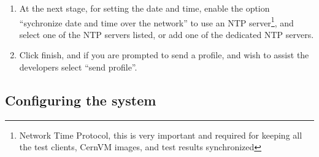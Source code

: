 \begin{enumerate}
\item	At the next stage, for setting the date and time, enable the option ``sychronize date and time over the network'' to use an NTP
		server\footnote{Network Time Protocol, this is very important and required for keeping all the test clients, CernVM images,
		and test results synchronized}, and select one of the NTP servers listed, or add one of the \cern dedicated NTP servers.
		
\item	Click finish, and if you are prompted to send a profile, and wish to assist the developers select ``send profile''.
\end{enumerate}

\subsection{Configuring the system}
\label{sec:rhconfig}
